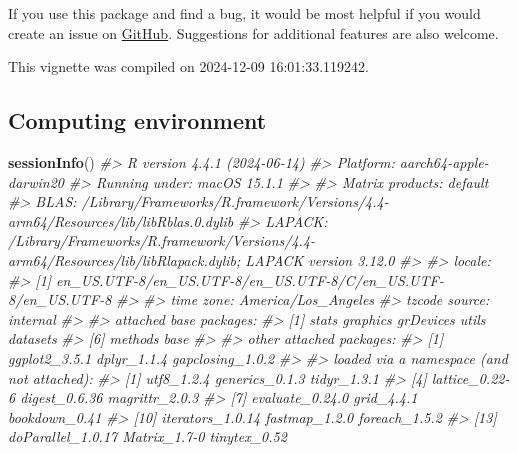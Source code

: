 \documentclass[
]{article}
\newenvironment{Shaded}{\begin{snugshade}}{\end{snugshade}}
\newcommand{\CommentTok}[1]{\textcolor[rgb]{0.56,0.35,0.01}{\textit{#1}}}
\newcommand{\FunctionTok}[1]{\textcolor[rgb]{0.13,0.29,0.53}{\textbf{#1}}}
\newcommand{\NormalTok}[1]{#1}
\begin{document}
If you use this package and find a bug, it would be most helpful if you would create an issue on \href{https://github.com/ilundberg/gapclosing}{GitHub}. Suggestions for additional features are also welcome.

This vignette was compiled on 2024-12-09 16:01:33.119242.

\subsection{Computing environment}\label{computing-environment}

\begin{Shaded}
\begin{Highlighting}[]
\FunctionTok{sessionInfo}\NormalTok{()}
\CommentTok{\#\textgreater{} R version 4.4.1 (2024{-}06{-}14)}
\CommentTok{\#\textgreater{} Platform: aarch64{-}apple{-}darwin20}
\CommentTok{\#\textgreater{} Running under: macOS 15.1.1}
\CommentTok{\#\textgreater{} }
\CommentTok{\#\textgreater{} Matrix products: default}
\CommentTok{\#\textgreater{} BLAS:   /Library/Frameworks/R.framework/Versions/4.4{-}arm64/Resources/lib/libRblas.0.dylib }
\CommentTok{\#\textgreater{} LAPACK: /Library/Frameworks/R.framework/Versions/4.4{-}arm64/Resources/lib/libRlapack.dylib;  LAPACK version 3.12.0}
\CommentTok{\#\textgreater{} }
\CommentTok{\#\textgreater{} locale:}
\CommentTok{\#\textgreater{} [1] en\_US.UTF{-}8/en\_US.UTF{-}8/en\_US.UTF{-}8/C/en\_US.UTF{-}8/en\_US.UTF{-}8}
\CommentTok{\#\textgreater{} }
\CommentTok{\#\textgreater{} time zone: America/Los\_Angeles}
\CommentTok{\#\textgreater{} tzcode source: internal}
\CommentTok{\#\textgreater{} }
\CommentTok{\#\textgreater{} attached base packages:}
\CommentTok{\#\textgreater{} [1] stats     graphics  grDevices utils     datasets }
\CommentTok{\#\textgreater{} [6] methods   base     }
\CommentTok{\#\textgreater{} }
\CommentTok{\#\textgreater{} other attached packages:}
\CommentTok{\#\textgreater{} [1] ggplot2\_3.5.1    dplyr\_1.1.4      gapclosing\_1.0.2}
\CommentTok{\#\textgreater{} }
\CommentTok{\#\textgreater{} loaded via a namespace (and not attached):}
\CommentTok{\#\textgreater{}  [1] utf8\_1.2.4        generics\_0.1.3    tidyr\_1.3.1      }
\CommentTok{\#\textgreater{}  [4] lattice\_0.22{-}6    digest\_0.6.36     magrittr\_2.0.3   }
\CommentTok{\#\textgreater{}  [7] evaluate\_0.24.0   grid\_4.4.1        bookdown\_0.41    }
\CommentTok{\#\textgreater{} [10] iterators\_1.0.14  fastmap\_1.2.0     foreach\_1.5.2    }
\CommentTok{\#\textgreater{} [13] doParallel\_1.0.17 Matrix\_1.7{-}0      tinytex\_0.52     }

\end{Highlighting}
\end{Shaded}
\end{document}
